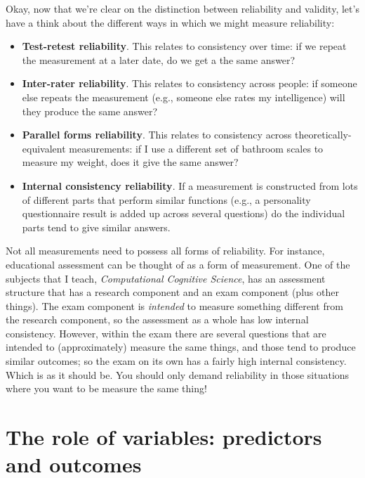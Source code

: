 \documentclass[]{book}
\begin{document}
Okay, now that we're clear on the distinction between reliability and validity, let's have a think about the different ways in which we might measure reliability:

\begin{itemize}
\item
  \textbf{Test-retest reliability}. This relates to consistency over time: if we repeat the measurement at a later date, do we get a the same answer?
\item
  \textbf{Inter-rater reliability}. This relates to consistency across people: if someone else repeats the measurement (e.g., someone else rates my intelligence) will they produce the same answer?
\item
  \textbf{Parallel forms reliability}. This relates to consistency across theoretically-equivalent measurements: if I use a different set of bathroom scales to measure my weight, does it give the same answer?
\item
  \textbf{Internal consistency reliability}. If a measurement is constructed from lots of different parts that perform similar functions (e.g., a personality questionnaire result is added up across several questions) do the individual parts tend to give similar answers.
\end{itemize}

Not all measurements need to possess all forms of reliability. For instance, educational assessment can be thought of as a form of measurement. One of the subjects that I teach, {\emph{Computational Cognitive Science}}, has an assessment structure that has a research component and an exam component (plus other things). The exam component is {\emph{intended}} to measure something different from the research component, so the assessment as a whole has low internal consistency. However, within the exam there are several questions that are intended to (approximately) measure the same things, and those tend to produce similar outcomes; so the exam on its own has a fairly high internal consistency. Which is as it should be. You should only demand reliability in those situations where you want to be measure the same thing!

\hypertarget{the-role-of-variables-predictors-and-outcomes}{%
\section{The role of variables: predictors and outcomes}\label{the-role-of-variables-predictors-and-outcomes}}
\end{document}
